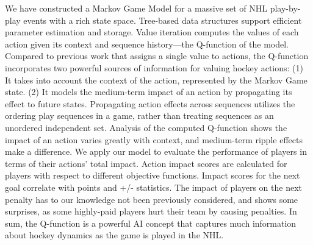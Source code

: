 \documentclass[]{article}
\begin{document}
We have constructed a Markov Game Model for a massive set of NHL play-by-play events with a rich state space.%
Tree-based data structures support efficient parameter estimation and storage. Value iteration computes the values of each action given its context and sequence history---the Q-function of the model. Compared to previous work that assigns a single value to actions, the Q-function incorporates two powerful sources of information for valuing hockey actions: (1) It takes into account the context of the action, represented by the Markov Game state. (2) It models the medium-term impact of an action by propagating its effect to future states. %
Propagating action effects across sequences utilizes the ordering play sequences in a game, rather than treating sequences as an unordered independent set.
%
Analysis of the computed Q-function shows the impact of an action varies greatly with context, and medium-term ripple effects make a difference. We apply our model to evaluate the performance of players in terms of their actions' total impact. Action impact scores are calculated for players with respect to different objective functions. Impact scores for the next goal correlate with points and +/- statistics. The impact of players on the next penalty has to our knowledge
not been previously considered, and shows some surprises, as some highly-paid players hurt their team by causing penalties. %
In sum, the Q-function is a powerful AI concept that captures much information about hockey dynamics as the game is played in the NHL.
\end{document}
